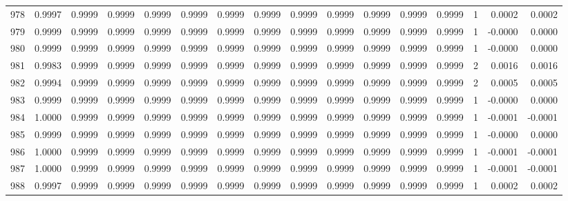 \begin{tabular}{lrrrrrrrrrrrrrrr}
978 &      0.9997 &  0.9999 &  0.9999 &  0.9999 &  0.9999 &  0.9999 &  0.9999 &  0.9999 &  0.9999 &  0.9999 &   0.9999 &     0.9999 &      1 &                    0.0002 &                     0.0002 \\
979 &      0.9999 &  0.9999 &  0.9999 &  0.9999 &  0.9999 &  0.9999 &  0.9999 &  0.9999 &  0.9999 &  0.9999 &   0.9999 &     0.9999 &      1 &                   -0.0000 &                     0.0000 \\
980 &      0.9999 &  0.9999 &  0.9999 &  0.9999 &  0.9999 &  0.9999 &  0.9999 &  0.9999 &  0.9999 &  0.9999 &   0.9999 &     0.9999 &      1 &                   -0.0000 &                     0.0000 \\
981 &      0.9983 &  0.9999 &  0.9999 &  0.9999 &  0.9999 &  0.9999 &  0.9999 &  0.9999 &  0.9999 &  0.9999 &   0.9999 &     0.9999 &      2 &                    0.0016 &                     0.0016 \\
982 &      0.9994 &  0.9999 &  0.9999 &  0.9999 &  0.9999 &  0.9999 &  0.9999 &  0.9999 &  0.9999 &  0.9999 &   0.9999 &     0.9999 &      2 &                    0.0005 &                     0.0005 \\
983 &      0.9999 &  0.9999 &  0.9999 &  0.9999 &  0.9999 &  0.9999 &  0.9999 &  0.9999 &  0.9999 &  0.9999 &   0.9999 &     0.9999 &      1 &                   -0.0000 &                     0.0000 \\
984 &      1.0000 &  0.9999 &  0.9999 &  0.9999 &  0.9999 &  0.9999 &  0.9999 &  0.9999 &  0.9999 &  0.9999 &   0.9999 &     0.9999 &      1 &                   -0.0001 &                    -0.0001 \\
985 &      0.9999 &  0.9999 &  0.9999 &  0.9999 &  0.9999 &  0.9999 &  0.9999 &  0.9999 &  0.9999 &  0.9999 &   0.9999 &     0.9999 &      1 &                   -0.0000 &                     0.0000 \\
986 &      1.0000 &  0.9999 &  0.9999 &  0.9999 &  0.9999 &  0.9999 &  0.9999 &  0.9999 &  0.9999 &  0.9999 &   0.9999 &     0.9999 &      1 &                   -0.0001 &                    -0.0001 \\
987 &      1.0000 &  0.9999 &  0.9999 &  0.9999 &  0.9999 &  0.9999 &  0.9999 &  0.9999 &  0.9999 &  0.9999 &   0.9999 &     0.9999 &      1 &                   -0.0001 &                    -0.0001 \\
988 &      0.9997 &  0.9999 &  0.9999 &  0.9999 &  0.9999 &  0.9999 &  0.9999 &  0.9999 &  0.9999 &  0.9999 &   0.9999 &     0.9999 &      1 &                    0.0002 &                     0.0002 \\

\end{tabular}
